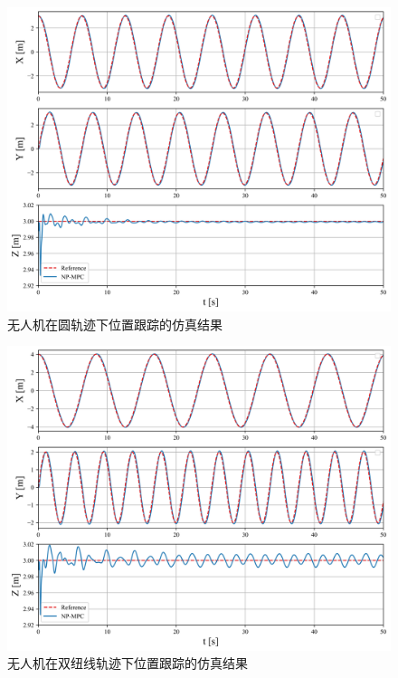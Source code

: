 \documentclass[lang=chs, degree=master, blindreview=false, winfonts=true]{yanputhesis}
\begin{document}
\begin{figure}[hbt!]
	\centering
	\includegraphics[width=33pc]{picture/kk/yuan.png} 
	\vspace{-0.2cm}
	\caption{无人机在圆轨迹下位置跟踪的仿真结果} 
	\label{yuan}
\end{figure}
\begin{figure}[hbt!]
	\centering
	\includegraphics[width=33pc]{picture/kk/bazi.png} 
	\vspace{-0.2cm}
	\caption{无人机在双纽线轨迹下位置跟踪的仿真结果} 
	\label{bazi}
\end{figure}
\end{document}
